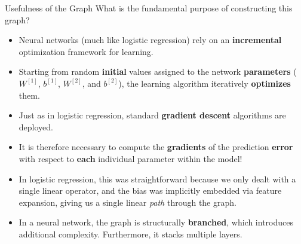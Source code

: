 \begin{frame}{Usefulness of the Graph}
	What is the fundamental purpose of constructing this graph?
	\pause
	\begin{itemize}
		\item Neural networks (much like logistic regression) rely on an \textbf{incremental} optimization framework for learning.
		\pause
		\item Starting from random \textbf{initial} values assigned to the network \textbf{parameters} ($W^{[1]}$, $b^{[1]}$, $W^{[2]}$, and $b^{[2]}$), the learning algorithm iteratively \textbf{optimizes} them.
		\pause
		\item Just as in logistic regression, standard \textbf{gradient descent} algorithms are deployed.
		\pause
		\item It is therefore necessary to compute the \textbf{gradients} of the prediction \textbf{error} with respect to \textbf{each} individual parameter within the model!
		\pause
		\item In logistic regression, this was straightforward because we only dealt with a single linear operator, and the bias was implicitly embedded via feature expansion, giving us a single linear \textit{path} through the graph.
		\pause
		\item In a neural network, the graph is structurally \textbf{branched}, which introduces additional complexity. Furthermore, it stacks multiple layers. 
	\end{itemize}
\end{frame}

